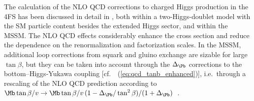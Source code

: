 The calculation of the NLO QCD corrections to charged Higgs production
in the 4FS has been discussed in detail in
, both within a two-Higgs-doublet model
with the SM particle content besides the extended Higgs sector, and
within the MSSM. The NLO QCD effects considerably enhance the cross
section and reduce the dependence on the renormalization and
factorization scales. In the MSSM, additional loop corrections from
squark and gluino exchange are sizable for large $\tan\beta$, but they
can be taken into account through the $\Delta_{\Pb}$ corrections
to
the bottom--Higgs-Yukawa coupling [cf.\ \Eq~(\ref{eq:qcd_tanb_enhanced})], i.e.\ through a rescaling of
the NLO QCD prediction according to $\Mb\tan\beta/v \to \Mb\tan\beta/v
\, (1 - \Delta_{\Pb}/\tan^2\beta) / (1 +
\Delta_{\Pb})$~\cite{Dittmaier:2009np}.

